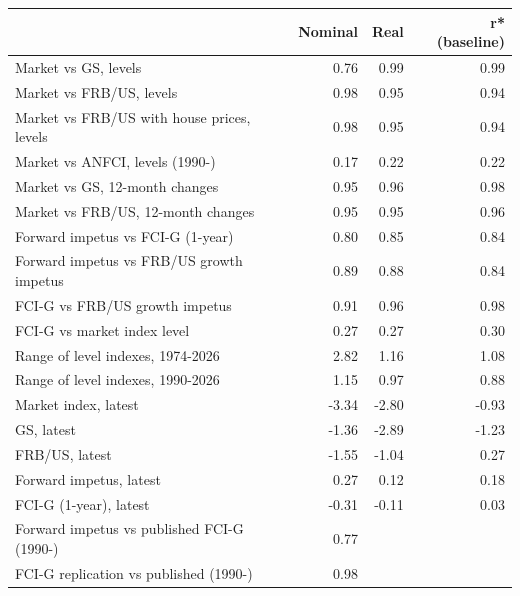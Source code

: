 \begin{tabular}{lrrr}
\toprule
 & Nominal & Real & r* (baseline) \\
\midrule
Market vs GS, levels & 0.76 & 0.99 & 0.99 \\
Market vs FRB/US, levels & 0.98 & 0.95 & 0.94 \\
Market vs FRB/US with house prices, levels & 0.98 & 0.95 & 0.94 \\
Market vs ANFCI, levels (1990-) & 0.17 & 0.22 & 0.22 \\
Market vs GS, 12-month changes & 0.95 & 0.96 & 0.98 \\
Market vs FRB/US, 12-month changes & 0.95 & 0.95 & 0.96 \\
Forward impetus vs FCI-G (1-year) & 0.80 & 0.85 & 0.84 \\
Forward impetus vs FRB/US growth impetus & 0.89 & 0.88 & 0.84 \\
FCI-G vs FRB/US growth impetus & 0.91 & 0.96 & 0.98 \\
FCI-G vs market index level & 0.27 & 0.27 & 0.30 \\
Range of level indexes, 1974-2026 & 2.82 & 1.16 & 1.08 \\
Range of level indexes, 1990-2026 & 1.15 & 0.97 & 0.88 \\
Market index, latest & -3.34 & -2.80 & -0.93 \\
GS, latest & -1.36 & -2.89 & -1.23 \\
FRB/US, latest & -1.55 & -1.04 & 0.27 \\
Forward impetus, latest & 0.27 & 0.12 & 0.18 \\
FCI-G (1-year), latest & -0.31 & -0.11 & 0.03 \\
Forward impetus vs published FCI-G (1990-) & 0.77 &  &  \\
FCI-G replication vs published (1990-) & 0.98 &  &  \\
\bottomrule
\end{tabular}
